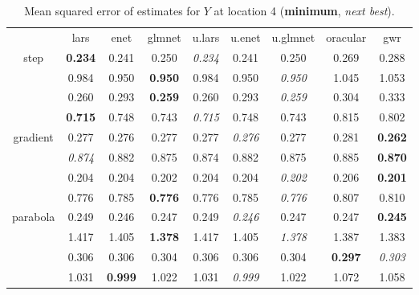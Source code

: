 \documentclass[authoryear, review, 11pt]{elsarticle}
\begin{document}
\begin{table}[ht]
\begin{center}
\begin{tabular}{ccccccccc}
  & lars & enet & glmnet & u.lars & u.enet & u.glmnet & oracular & gwr \\ 
  \cline{2-9}
  \multirow{4}{*}{step} & \textbf{0.234} & 0.241 & 0.250 & \emph{0.234} & 0.241 & 0.250 & 0.269 & 0.288 \\ 
  & 0.984 & 0.950 & \textbf{0.950} & 0.984 & 0.950 & \emph{0.950} & 1.045 & 1.053 \\ 
  & 0.260 & 0.293 & \textbf{0.259} & 0.260 & 0.293 & \emph{0.259} & 0.304 & 0.333 \\ 
  & \textbf{0.715} & 0.748 & 0.743 & \emph{0.715} & 0.748 & 0.743 & 0.815 & 0.802 \\ 
  \cline{2-9}
  \multirow{4}{*}{gradient} & 0.277 & 0.276 & 0.277 & 0.277 & \emph{0.276} & 0.277 & 0.281 & \textbf{0.262} \\ 
  & \emph{0.874} & 0.882 & 0.875 & 0.874 & 0.882 & 0.875 & 0.885 & \textbf{0.870} \\ 
  & 0.204 & 0.204 & 0.202 & 0.204 & 0.204 & \emph{0.202} & 0.206 & \textbf{0.201} \\ 
  & 0.776 & 0.785 & \textbf{0.776} & 0.776 & 0.785 & \emph{0.776} & 0.807 & 0.810 \\ 
  \cline{2-9}
  \multirow{4}{*}{parabola} & 0.249 & 0.246 & 0.247 & 0.249 & \emph{0.246} & 0.247 & 0.247 & \textbf{0.245} \\ 
  & 1.417 & 1.405 & \textbf{1.378} & 1.417 & 1.405 & \emph{1.378} & 1.387 & 1.383 \\ 
  & 0.306 & 0.306 & 0.304 & 0.306 & 0.306 & 0.304 & \textbf{0.297} & \emph{0.303} \\ 
  & 1.031 & \textbf{0.999} & 1.022 & 1.031 & \emph{0.999} & 1.022 & 1.072 & 1.058 \\ 
  \end{tabular}
\caption{Mean squared error of estimates for $Y$ at location 4 (\textbf{minimum}, \emph{next best}).\label{table:loc4-MSEY}}
\end{center}
\end{table}
\end{document}

